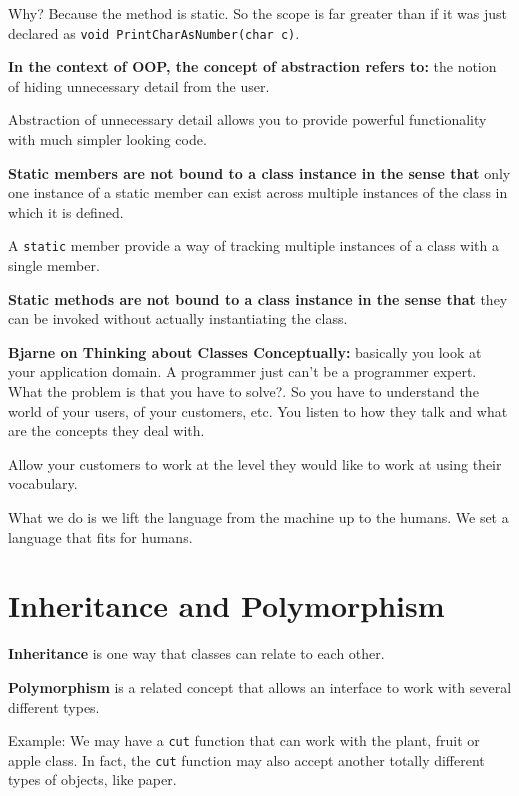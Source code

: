 \documentclass[11pt, a4paper]{article}
\begin{document}
Why? Because the method is static. So the scope is far greater than if it was just declared as \texttt{void PrintCharAsNumber(char c)}.



\textbf{In the context of OOP, the concept of abstraction refers to:} the notion of hiding unnecessary detail from the user.

Abstraction of unnecessary detail allows you to provide powerful functionality with much simpler looking code.

\textbf{Static members are not bound to a class instance in the sense that} only one instance of a static member can exist across multiple instances of the class in which it is defined.

A \texttt{static} member provide a way of tracking multiple instances of a class with a single member.

\textbf{Static methods are not bound to a class instance in the sense that} they can be invoked  without actually instantiating the class.



\textbf{Bjarne on Thinking about Classes Conceptually:} basically you look at your application domain. A programmer just can't be a programmer expert. What the problem is that you have to solve?. So you have to understand the world of your users, of your customers, etc. You listen to how they talk and what are the concepts they deal with. 

Allow your customers to work at the level they would like to work at using their vocabulary. 

What we do is we lift the language from the machine up to the humans. We set a language that fits for humans.




\section{Inheritance and Polymorphism}%
\label{sec:inheritance_and_polymorphism}

\textbf{Inheritance} is one way that classes can relate to each other. 

\textbf{Polymorphism} is a related concept that allows an interface to work with several different types. 

Example: We may have a \texttt{cut} function that can work with the plant, fruit or apple class. In fact, the \texttt{cut} function may also accept another totally different types of objects, like paper. 
\end{document}
